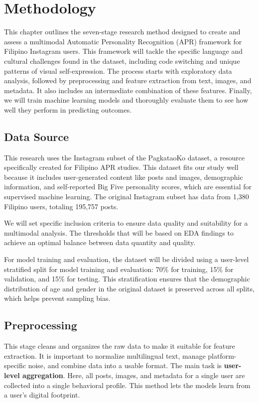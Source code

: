 \chapter{Methodology}
\label{sec:methodology}

This chapter outlines the seven-stage research method designed to create and assess a multimodal Automatic Personality Recognition (APR) framework for Filipino Instagram users. This framework will tackle the specific language and cultural challenges found in the dataset, including code switching and unique patterns of visual self-expression. The process starts with exploratory data analysis, followed by preprocessing and feature extraction from text, images, and metadata. It also includes an intermediate combination of these features. Finally, we will train machine learning models and thoroughly evaluate them to see how well they perform in predicting outcomes.

\section{Data Source}
\label{sec:data}
This research uses the Instagram subset of the PagkataoKo dataset, a resource specifically created for Filipino APR studies. This dataset fits our study well because it includes user-generated content like posts and images, demographic information, and self-reported Big Five personality scores, which are essential for supervised machine learning. The original Instagram subset has data from 1,380 Filipino users, totaling 195,757 posts. 

We will set specific inclusion criteria to ensure data quality and suitability for a multimodal analysis. The  thresholds that will be based on EDA findings to achieve an optimal balance between data quantity and quality. 

For model training and evaluation, the dataset will be divided using a user-level stratified split for model training and evaluation: 70\% for training, 15\% for validation, and 15\% for testing. This stratification ensures that the demographic distribution of age and gender in the original dataset is preserved across all splits, which helps prevent sampling bias.

\section{Preprocessing}
This stage cleans and organizes the raw data to make it suitable for feature extraction. It is important to normalize multilingual text, manage platform-specific noise, and combine data into a usable format. The main task is \textbf{user-level aggregation}. Here, all posts, images, and metadata for a single user are collected into a single behavioral profile. This method lets the models learn from a user's digital footprint.


